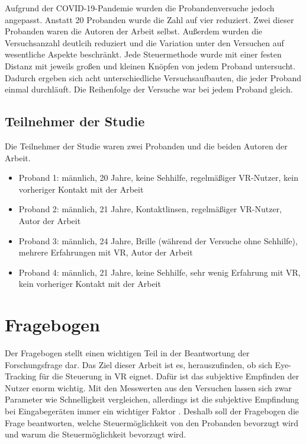 Aufgrund der \ac{COVID-19}-Pandemie wurden die Probandenversuche jedoch angepasst. Anstatt 20 Probanden wurde die Zahl auf vier reduziert. Zwei dieser Probanden waren die Autoren der Arbeit selbst. Außerdem wurden die Versuchsanzahl deutlcih reduziert und die Variation unter den Versuchen auf wesentliche Aspekte beschränkt. Jede Steuermethode wurde mit einer festen Distanz mit jeweils großen und kleinen Knöpfen von jedem Proband untersucht. Dadurch ergeben sich acht unterschiedliche Versuchsaufbauten, die jeder Proband einmal durchläuft. Die Reihenfolge der Versuche war bei jedem Proband gleich. 

\subsection{Teilnehmer der Studie}
Die Teilnehmer der Studie waren zwei Probanden und die beiden Autoren der Arbeit.
\begin{itemize}
	\item Proband 1: männlich, 20 Jahre, keine Sehhilfe, regelmäßiger VR-Nutzer, kein vorheriger Kontakt mit der Arbeit
	\item Proband 2: männlich, 21 Jahre, Kontaktlinsen, regelmäßiger VR-Nutzer, Autor der Arbeit
	\item Proband 3: männlich, 24 Jahre, Brille (während der Versuche ohne Sehhilfe), mehrere Erfahrungen mit VR, Autor der Arbeit
	\item Proband 4: männlich, 21 Jahre, keine Sehhilfe, sehr wenig Erfahrung mit VR, kein vorheriger Kontakt mit der Arbeit
\end{itemize}

\section{Fragebogen} 
\label{section:fragebogen}
Der Fragebogen stellt einen wichtigen Teil in der Beantwortung der Forschungsfrage dar. Das Ziel dieser Arbeit ist es, herauszufinden, ob sich Eye-Tracking für die Steuerung in VR eignet. Dafür ist das subjektive Empfinden der Nutzer enorm wichtig. Mit den Messwerten aus den Versuchen lassen sich zwar Parameter wie Schnelligkeit vergleichen, allerdings ist die subjektive Empfindung bei Eingabegeräten immer ein wichtiger Faktor . Deshalb soll der Fragebogen die Frage beantworten, welche Steuermöglichkeit von den Probanden bevorzugt wird und warum die Steuermöglichkeit bevorzugt wird.
